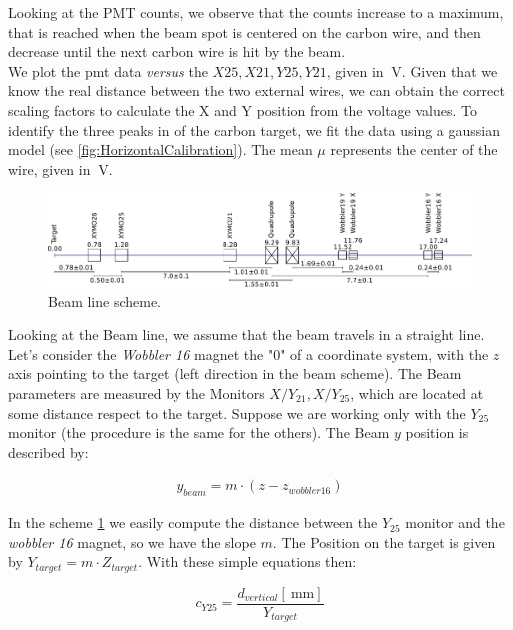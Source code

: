 Looking at the PMT counts, we observe that the counts increase to a maximum, that is reached when the beam spot is centered on the carbon wire, and then decrease until the next carbon wire is hit by the beam.\\
We plot the pmt data \textit{versus} the $X25,X21,Y25,Y21$, given in $\SI{}{\volt}$. 
Given that we know the real distance between the two external wires, we can obtain the correct scaling factors to calculate the X and Y position from the voltage values. To identify the three peaks in of the carbon target, we fit the data using a gaussian model (see \ref{fig:HorizontalCalibration}). The mean $\mu$ represents the center of the wire, given in $\SI{}{\volt}$.


\begin{figure}[hbtp]
\centering
\includegraphics[scale=0.4]{figures/XYMOCalibBeamLine.pdf}
\caption{Beam line scheme.}
\label{fig:BeamLine}
\end{figure}


Looking at the Beam line, we assume that the beam travels in a straight line. Let's consider the \textit{Wobbler 16} magnet the "$0$" of a coordinate system, with the $z$ axis pointing to the target (left direction in the beam scheme). The Beam parameters are measured by the Monitors $X/Y_{21}, X/Y_{25}$, which are located at some distance respect to the target. Suppose we are working only with the $Y_{25}$ monitor (the procedure is the same for the others). The Beam $y$ position is described by:

\begin{align*}
y_{beam} = m \cdot (z - z_{wobbler 16})
\end{align*}

In the scheme \ref{fig:BeamLine} we easily compute the distance between the $Y_{25}$ monitor and the \textit{wobbler 16} magnet, so we have the slope $m$. The Position on the target is given by $Y_{target} = m \cdot Z_{target}$. With these simple equations then:

\begin{equation}
c_{Y25} = \dfrac{d_{vertical} [\SI{}{\milli \meter}]}{ Y_{target}} 
\end{equation}

